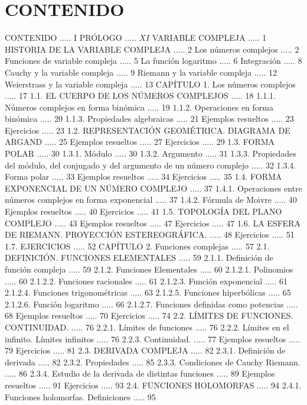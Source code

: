 \documentclass[10pt]{article}
\begin{document}
\section*{CONTENIDO}
CONTENIDO ..... I
PRÓLOGO ..... $X I$
VARIABLE COMPLEJA ..... 1
HISTORIA DE LA VARIABLE COMPLEJA ..... 2
Los números complejos ..... 2
Funciones de variable compleja ..... 5
La función logaritmo ..... 6
Integración ..... 8
Cauchy y la variable compleja ..... 9
Riemann y la variable compleja ..... 12
Weierstrass y la variable compleja ..... 13
CAPÍTULO 1. Los números complejos ..... 17
1.1. EL CUERPO DE LOS NÚMEROS COMPLEJOS ..... 18
1.1.1. Números complejos en forma binómica ..... 19
1.1.2. Operaciones en forma binómica ..... 20
1.1.3. Propiedades algebraicas ..... 21
Ejemplos resueltos ..... 23
Ejercicios ..... 23
1.2. REPRESENTACIÓN GEOMÉTRICA. DIAGRAMA DE ARGAND ..... 25
Ejemplos resueltos ..... 27
Ejercicios ..... 29
1.3. FORMA POLAR ..... 30
1.3.1. Módulo ..... 30
1.3.2. Argumento ..... 31
1.3.3. Propiedades del módulo, del conjugado y del argumento de un número complejo ..... 32
1.3.4. Forma polar ..... 33
Ejemplos resueltos ..... 34
Ejercicios ..... 35
1.4. FORMA EXPONENCIAL DE UN NÚMERO COMPLEJO ..... 37
1.4.1. Operaciones entre números complejos en forma exponencial ..... 37
1.4.2. Fórmula de Moivre ..... 40
Ejemplos resueltos ..... 40
Ejercicios ..... 41
1.5. TOPOLOGÍA DEL PLANO COMPLEJO ..... 43
Ejemplos resueltos ..... 47
Ejercicios ..... 47
1.6. LA ESFERA DE RIEMANN. PROYECCIÓN ESTEREOGRÁFICA. ..... 48
Ejercicios ..... 51
1.7. EJERCICIOS ..... 52
CAPÍTULO 2. Funciones complejas ..... 57
2.1. DEFINICIÓN. FUNCIONES ELEMENTALES ..... 59
2.1.1. Definición de función compleja ..... 59
2.1.2. Funciones Elementales ..... 60
2.1.2.1. Polinomios ..... 60
2.1.2.2. Funciones racionales ..... 61
2.1.2.3. Función exponencial ..... 61
2.1.2.4. Funciones trigonométricas ..... 63
2.1.2.5. Funciones hiperbólicas ..... 65
2.1.2.6. Función logaritmo ..... 66
2.1.2.7. Funciones definidas como potencias ..... 68
Ejemplos resueltos ..... 70
Ejercicios ..... 74
2.2. LÍMITES DE FUNCIONES. CONTINUIDAD. ..... 76
2.2.1. Límites de funciones ..... 76
2.2.2. Límites en el infinito. Límites infinitos ..... 76
2.2.3. Continuidad. ..... 77
Ejemplos resueltos ..... 79
Ejercicios ..... 81
2.3. DERIVADA COMPLEJA ..... 82
2.3.1. Definición de derivada ..... 82
2.3.2. Propiedades ..... 85
2.3.3. Condiciones de Cauchy Riemann. ..... 86
2.3.4. Estudio de la derivada de distintas funciones ..... 89
Ejemplos resueltos ..... 91
Ejercicios ..... 93
2.4. FUNCIONES HOLOMORFAS ..... 94
2.4.1. Funciones holomorfas. Definiciones ..... 95
\end{document}
